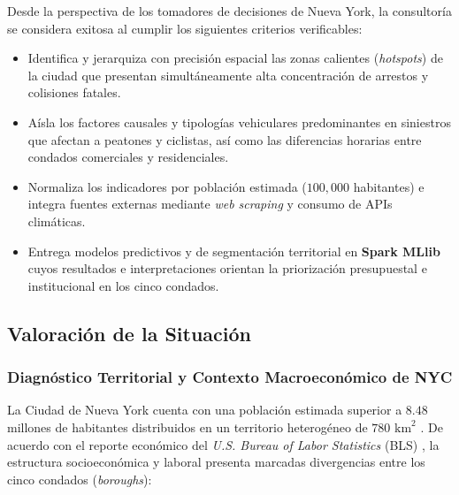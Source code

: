 Desde la perspectiva de los tomadores de decisiones de Nueva York, la consultoría se considera exitosa al cumplir los siguientes criterios verificables:

\begin{itemize}
    \item Identifica y jerarquiza con precisión espacial las zonas calientes (\textit{hotspots}) de la ciudad que presentan simultáneamente alta concentración de arrestos y colisiones fatales.
    \item Aísla los factores causales y tipologías vehiculares predominantes en siniestros que afectan a peatones y ciclistas, así como las diferencias horarias entre condados comerciales y residenciales.
    \item Normaliza los indicadores por población estimada ($100,000$ habitantes) e integra fuentes externas mediante \textit{web scraping} y consumo de APIs climáticas.
    \item Entrega modelos predictivos y de segmentación territorial en \textbf{Spark MLlib} cuyos resultados e interpretaciones orientan la priorización presupuestal e institucional en los cinco condados.
\end{itemize}

\subsection{Valoración de la Situación}

\subsubsection{Diagnóstico Territorial y Contexto Macroeconómico de NYC}

La Ciudad de Nueva York cuenta con una población estimada superior a $8.48$ millones de habitantes distribuidos en un territorio heterogéneo de $780\text{ km}^2$ \cite{us_census_quickfacts_nyc}. De acuerdo con el reporte económico del \textit{U.S. Bureau of Labor Statistics} (BLS) \cite{bls_nyc_2024}, la estructura socioeconómica y laboral presenta marcadas divergencias entre los cinco condados (\textit{boroughs}):

